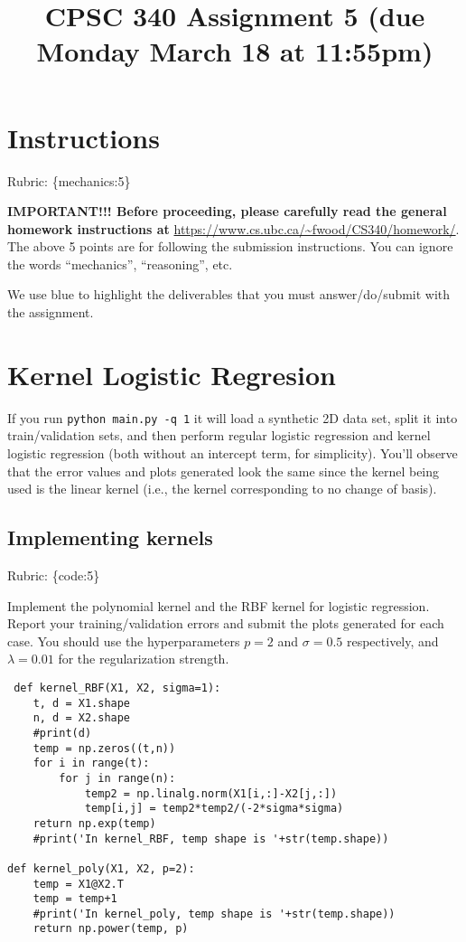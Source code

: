 \documentclass{article}
\def\rubric#1{\gre{Rubric: \{#1\}}}{}
\def\blu#1{{\color{blu}#1}}
\def\gre#1{{\color{gre}#1}}
\begin{document}
\title{CPSC 340 Assignment 5 (due Monday March 18 at 11:55pm)}
\date{}
\maketitle

\vspace{-7em}


\section*{Instructions}
\rubric{mechanics:5}

\textbf{IMPORTANT!!! Before proceeding, please carefully read the general homework instructions at} \url{https://www.cs.ubc.ca/~fwood/CS340/homework/}. The above 5 points are for following the submission instructions. You can ignore the words ``mechanics'', ``reasoning'', etc.

\vspace{1em}
We use \blu{blue} to highlight the deliverables that you must answer/do/submit with the assignment.


\section{Kernel Logistic Regresion}

If you run \verb|python main.py -q 1| it will load a synthetic 2D data set, split it into train/validation sets, and then perform regular logistic regression and kernel logistic regression (both without an intercept term, for simplicity). You'll observe that the error values and plots generated look the same since the kernel being used is the linear kernel (i.e., the kernel corresponding to no change of basis).

\subsection{Implementing kernels}
\rubric{code:5}

 \blu{Implement the polynomial kernel and the RBF kernel for logistic regression. Report your training/validation errors and submit the plots generated for each case}. You should use the hyperparameters $p=2$ and $\sigma=0.5$ respectively, and $\lambda=0.01$ for the regularization strength.
 
 \begin{lstlisting}
 def kernel_RBF(X1, X2, sigma=1):
    t, d = X1.shape
    n, d = X2.shape
    #print(d)
    temp = np.zeros((t,n))
    for i in range(t):
        for j in range(n):
            temp2 = np.linalg.norm(X1[i,:]-X2[j,:])
            temp[i,j] = temp2*temp2/(-2*sigma*sigma)
    return np.exp(temp)
    #print('In kernel_RBF, temp shape is '+str(temp.shape))

def kernel_poly(X1, X2, p=2):
    temp = X1@X2.T
    temp = temp+1
    #print('In kernel_poly, temp shape is '+str(temp.shape))
    return np.power(temp, p)
 \end{lstlisting}
 
\end{document}
